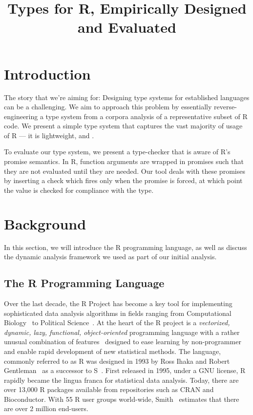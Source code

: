 \documentclass[acmsmall,review,anonymous]{acmart}\settopmatter{printfolios=true,printccs=false,printacmref=false}
\begin{document}
\title{Types for R, Empirically Designed and Evaluated}
\begin{abstract}

\end{abstract}
\maketitle


\section{Introduction}

The story that we're aiming for:
Designing type systems for established languages can be a challenging.
We aim to approach this problem by essentially reverse-engineering a type system from a corpora analysis of a representative subset of R code.
We present a simple type system that captures the vast majority of usage of R --- it is lightweight, and .

To evaluate our type system, we present a type-checker that is aware of R's promise semantics. 
In R, function arguments are wrapped in promises such that they are not evaluated until they are needed.
Our tool deals with these promises by inserting a check which fires only when the promise is forced, at which point the value is checked for compliance with the type.


%
%
%
%
%
%
\section{Background}

In this section, we will introduce the R programming language, as well as discuss the dynamic analysis framework we used as part of our initial analysis.

%
%
%
%
\subsection{The R Programming Language}
\label{sec:R}

Over the last decade, the R Project has become a key tool for implementing
sophisticated data analysis algorithms in fields ranging from Computational
Biology~\cite{R05} to Political Science~\cite{R:Keele:2008}. At the heart of
the R project is a \emph{vectorized, dynamic, lazy, functional,
  object-oriented} programming language with a rather unusual combination of
features~\cite{ecoop12} designed to ease learning by non-programmer and
enable rapid development of new statistical methods.  The language, commonly
referred to as R was designed in 1993 by Ross Ihaka and Robert
Gentleman~\cite{R96} as a successor to S~\cite{S88}.  First released in
1995, under a GNU license, R rapidly became the lingua franca for
statistical data analysis. Today, there are over 13,000 R packages available
from repositories such as CRAN and Bioconductor.  With 55 R user groups
world-wide, Smith~\cite{eco11} estimates that there are over 2 million
end-users.
\end{document}
